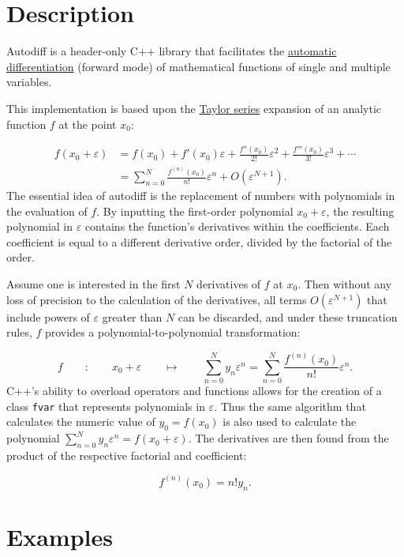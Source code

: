 \documentclass{article}
\begin{document}
\section{Description}

Autodiff is a header-only C++ library that facilitates the
\href{https://en.wikipedia.org/wiki/Automatic_differentiation}{automatic differentiation} (forward mode) of
mathematical functions of single and multiple variables.

This implementation is based upon the \href{https://en.wikipedia.org/wiki/Taylor_series}{Taylor series} expansion of
an analytic function $f$ at the point $x_0$:

\begin{align*}
f(x_0+\varepsilon) &= f(x_0) + f'(x_0)\varepsilon + \frac{f''(x_0)}{2!}\varepsilon^2 + \frac{f'''(x_0)}{3!}\varepsilon^3 + \cdots \\
  &= \sum_{n=0}^N\frac{f^{(n)}(x_0)}{n!}\varepsilon^n + O\left(\varepsilon^{N+1}\right).
\end{align*}
The essential idea of autodiff is the replacement of numbers with polynomials in the evaluation of $f$. By inputting
the first-order polynomial $x_0+\varepsilon$, the resulting polynomial in $\varepsilon$ contains the function's
derivatives within the coefficients. Each coefficient is equal to a different derivative order, divided by the
factorial of the order.

Assume one is interested in the first $N$ derivatives of $f$ at $x_0$. Then without any loss of precision to the
calculation of the derivatives, all terms $O\left(\varepsilon^{N+1}\right)$ that include powers of $\varepsilon$
greater than $N$ can be discarded, and under these truncation rules, $f$ provides a polynomial-to-polynomial
transformation:

\[
f \qquad : \qquad x_0+\varepsilon \qquad \mapsto \qquad
    \sum_{n=0}^Ny_n\varepsilon^n=\sum_{n=0}^N\frac{f^{(n)}(x_0)}{n!}\varepsilon^n.
\]
C++'s ability to overload operators and functions allows for the creation of a class {\tt fvar} that represents
polynomials in $\varepsilon$. Thus the same algorithm that calculates the numeric value of $y_0=f(x_0)$ is also
used to calculate the polynomial $\sum_{n=0}^Ny_n\varepsilon^n=f(x_0+\varepsilon)$. The derivatives are then found
from the product of the respective factorial and coefficient:

\[ f^{(n)}(x_0)=n!y_n. \]

\section{Examples}
\end{document}
